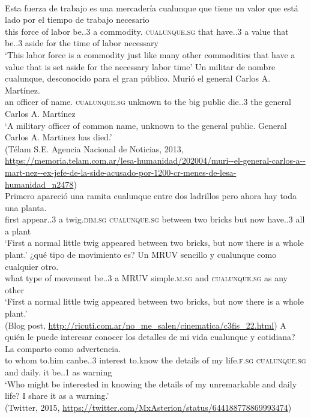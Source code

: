 \documentclass[output=paper,colorlinks,citecolor=brown]{langscibook}
\begin{document}
\ea\label{ex:fk20}\citep{Silberstein1967}\\
\gll Esta fuerza de trabajo es una mercadería cualunque que tiene un valor que está lado por el tiempo de trabajo necesario\\
    this force of labor be.{\PRS.3\SG} a {commodity.\SG} \textsc{cualunque.sg} that have.{\PRS.3\SG} a value that be.{\PRS.3\SG} aside for the time of labor necessary\\
\glt‘This labor force is a commodity just like many other commodities that have a value that is set aside for the necessary labor time’
\ex\label{ex:fk21}
\gll Un militar de nombre cualunque, desconocido para el gran público. Murió el general Carlos A. Martínez.\\
    an officer of {name.\SG} \textsc{cualunque.sg} unknown to the big public die.{\PST.3\SG} the general Carlos A. Martínez\\
\glt    ‘A military officer of common name, unknown to the general public. General Carlos A. Martinez has died.’\\
(Télam S.E. Agencia Nacional de Noticias, 2013, \url{https://memoria.telam.com.ar/lesa-humanidad/202004/muri--el-general-carlos-a--mart-nez--ex-jefe-de-la-side-acusado-por-1200-cr-menes-de-lesa-humanidad_n2478})
\ex\label{ex:fk22}\citep[193]{Romano1999}\\
\gll Primero apareció una ramita cualunque entre dos ladrillos pero ahora hay toda una planta.\\
    first appear.{\PST.3\SG} a twig.\textsc{dim.sg} \textsc{cualunque.sg} between two bricks but now have.{\PRS.3\SG} all a plant\\
\glt  ‘First a normal little twig appeared between two bricks, but now there is a whole plant.’
\pagebreak
\ex\label{ex:fk23}
\gll ¿qué tipo de movimiento es? Un MRUV sencillo y cualunque como cualquier otro.\\
    what type of movement be.{\PRS.3\SG} a MRUV simple.\textsc{m.sg} and \textsc{cualunque.sg} as any other\\
\glt ‘First a normal little twig appeared between two bricks, but now there is a whole plant.’\\
(Blog post, \url{http://ricuti.com.ar/no_me_salen/cinematica/c3fis_22.html})
\ex\label{ex:fk24}
\gll A quién le puede interesar conocer los detalles de mi vida cualunque y cotidiana? La comparto como advertencia.\\
    to whom to.him canbe.{\PRS.3\SG} interest to.know the details of my life.\textsc{f.sg} \textsc{cualunque.sg} and {daily.\SG} it be.{\PRS.1\SG} as warning\\
\glt    ‘Who might be interested in knowing the details of my unremarkable and daily life? I share it as a warning.’\\
    (Twitter, 2015, \url{https://twitter.com/MxAsterion/status/644188778869993474})
\z
\end{document}
